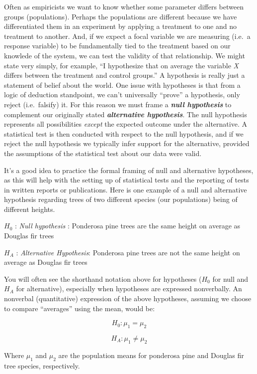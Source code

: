 \documentclass[]{book}
\begin{document}
Often as empiricists we want to know whether some parameter differs between groups (populations). Perhaps the populations are different because we have differentiated them in an experiment by applying a treatment to one and no treatment to another. And, if we expect a focal variable we are measuring (i.e.~a response variable) to be fundamentally tied to the treatment based on our knowlede of the system, we can test the validity of that relationship. We might state very simply, for example, ``I hypothesize that on average the variable \emph{X} differs between the treatment and control groups.'' A hypothesis is really just a statement of belief about the world. One issue with hypotheses is that from a logic of deduction standpoint, we can't universally ``prove'' a hypothesis, only reject (i.e.~falsify) it. For this reason we must frame a \textbf{\emph{null hypothesis}} to complement our originally stated \textbf{\emph{alternative hypothesis}}. The null hypothesis represents all possibilities \emph{except} the expected outcome under the alternative. A statistical test is then conducted with respect to the null hypothesis, and if we reject the null hypothesis we typically infer support for the alternative, provided the assumptions of the statistical test about our data were valid.

It's a good idea to practice the formal framing of null and alternative hypotheses, as this will help with the setting up of statistical tests and the reporting of tests in written reports or publications. Here is one example of a null and alternative hypothesis regarding trees of two different species (our populations) being of different heights.

\(H_0\) : \emph{Null hypothesis} : Ponderosa pine trees are the same height on average as Douglas fir trees

\(H_A\) : \emph{Alternative Hypothesis}: Ponderosa pine trees are not the same height on average as Douglas fir trees

You will often see the shorthand notation above for hypotheses (\(H_0\) for null and \(H_A\) for alternative), especially when hypotheses are expressed nonverbally. An nonverbal (quantitative) expression of the above hypotheses, assuming we choose to compare ``averages'' using the mean, would be:

\[H_0 : \mu_1 = \mu_2\]

\[H_A: \mu_1 \neq \mu_2\]

Where \(\mu_1\) and \(\mu_2\) are the population means for ponderosa pine and Douglas fir tree species, respectively.
\end{document}
